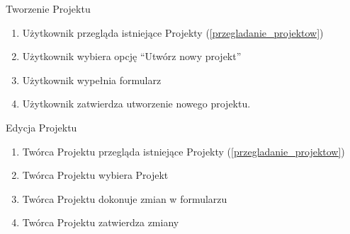\begin{usecase}{Tworzenie Projektu}
\label{tworzenie_projektu}
	\begin{enumerate}
    \item Użytkownik przegląda istniejące Projekty (\ref{przegladanie_projektow})
    \item Użytkownik wybiera opcję  “Utwórz nowy projekt”
    \item Użytkownik wypełnia formularz
    \item Użytkownik zatwierdza utworzenie nowego projektu.
	\end{enumerate}
\end{usecase}


\begin{usecase}{Edycja Projektu}
	\begin{enumerate}
    \item Twórca Projektu przegląda istniejące Projekty (\ref{przegladanie_projektow})
    \item Twórca Projektu wybiera Projekt
    \item Twórca Projektu dokonuje zmian w formularzu
    \item Twórca Projektu zatwierdza zmiany
	\end{enumerate}
\end{usecase}


